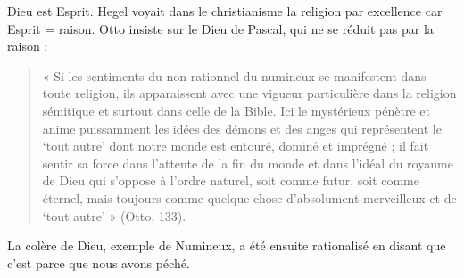 Dieu est Esprit. Hegel voyait dans le christianisme la religion par excellence car Esprit = raison. 
Otto insiste sur le Dieu de Pascal, qui ne se réduit pas par la raison : 
\begin{quote}
    « Si les sentiments du non-rationnel du numineux se manifestent dans toute religion, ils apparaissent avec une vigueur particulière dans la religion sémitique et surtout dans celle de la Bible. Ici le mystérieux pénètre et anime puissamment les idées des démons et des anges qui représentent le ‘tout autre’ dont notre monde est entouré, dominé et imprégné ; il fait sentir sa force dans l’attente de la fin du monde et dans l’idéal du royaume de Dieu qui s’oppose à l’ordre naturel, soit comme futur, soit comme éternel, mais toujours comme quelque chose d’absolument merveilleux et de ‘tout autre’ » (Otto, 133). 
\end{quote}


\begin{Ex}
La colère de Dieu, exemple de Numineux, a été ensuite rationalisé en disant que c'est parce que nous avons péché.
\end{Ex}
